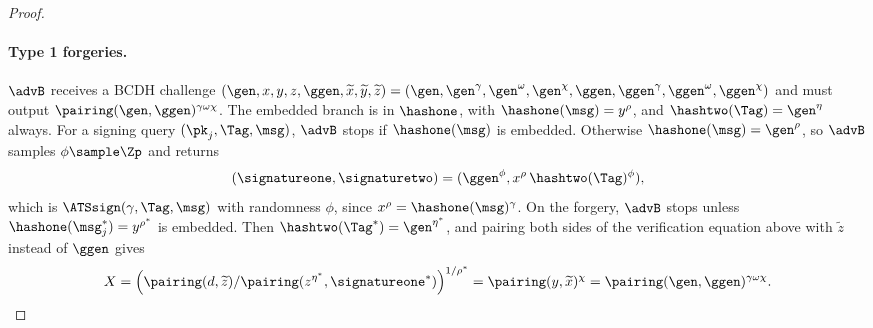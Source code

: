 \begin{proof}
  \paragraph{Type 1 forgeries.} $\advB$ receives a BCDH challenge $(\gen, x, y, z,
\ggen, \widetilde{x}, \widetilde{y}, \widetilde{z}) = (\gen, \gen^\gamma,
\gen^\omega, \gen^\chi, \ggen, \ggen^\gamma, \ggen^\omega, \ggen^\chi)$ and must
output $\pairing(\gen, \ggen)^{\gamma\omega\chi}$. The embedded branch is in
$\hashone$, with $\hashone(\msg) = y^\rho$, and $\hashtwo(\Tag) = \gen^\eta$ always.
For a signing query $(\pk_j, \Tag, \msg)$, $\advB$ stops if $\hashone(\msg)$ is
embedded. Otherwise $\hashone(\msg) = \gen^\rho$, so $\advB$ samples $\phi \sample
\Zp$ and returns
%
\begin{equation*}
  (\signatureone, \signaturetwo) = (\ggen^\phi, x^\rho\,\hashtwo(\Tag)^\phi),
\end{equation*}
%
which is $\ATSsign(\gamma, \Tag, \msg)$ with randomness $\phi$, since $x^\rho =
\hashone(\msg)^\gamma$. On the forgery, $\advB$ stops unless $\hashone(\msg^*_j) =
y^{\rho^*}$ is embedded. Then $\hashtwo(\Tag^*) = \gen^{\eta^*}$, and pairing both
sides of the verification equation above with $\widetilde{z}$ instead of $\ggen$
gives
%
\begin{equation*}
  X = \left(\pairing(d, \widetilde{z}) / \pairing(z^{\eta^*},
\signatureone^*)\right)^{1/\rho^*} = \pairing(y, \widetilde{x})^{\chi} =
\pairing(\gen, \ggen)^{\gamma\omega\chi}.
\end{equation*}


\end{proof}
